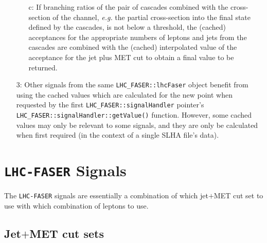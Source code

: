 \documentclass[10pt]{article}
\newcommand{\ie}[0]{\textit{e.g.}\xspace}
\newcommand{\faser}[0]{\texttt{LHC-FASER}\xspace}
\newcommand{\lf}[1]{\texttt{LHC\_FASER::#1}}
\begin{document}
\begin{itemize}
\begin{itemize}
  \item[c:] If branching ratios of the pair of cascades combined with the
            cross-section of the channel, \ie the partial cross-section into
            the final state defined by the cascades, is not below a threshold,
            the (cached) acceptances for the appropriate numbers of leptons and
            jets from the cascades are combined with the (cached) interpolated
            value of the acceptance for the jet plus MET cut to obtain a final
            value to be returned.

  \end{itemize}

\item[3:] Other signals from the same \lf{lhcFaser} object benefit from using
          the cached values which are calculated for the new point when
          requested by the first \lf{signalHandler} pointer's\\
          \lf{signalHandler::getValue()} function. However, some cached values
          may only be relevant to some signals, and they are only be calculated
          when first required (in the context of a single SLHA file's data).

\end{itemize}


\section{\faser Signals}
\label{sec:signals}

The \faser signals are essentially a combination of which jet$+$MET cut set to
 use with which combination of leptons to use.


\subsection{Jet$+$MET cut sets}
\label{subsec:jetPlusMetSets}
\end{document}
